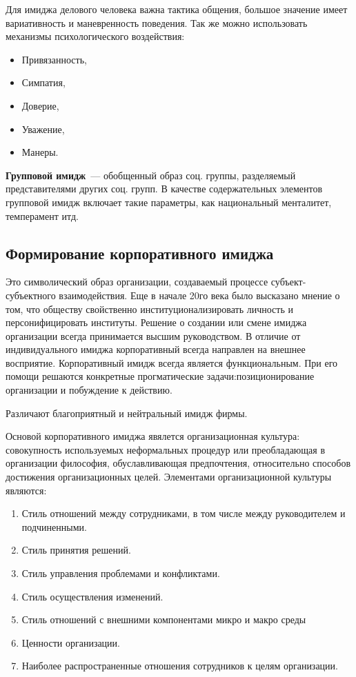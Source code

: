 Для имиджа делового человека важна тактика общения, большое значение имеет вариативность и маневренность поведения. Так же можно использовать механизмы психологического воздействия:
\begin{itemize}
	\item Привязанность,
	\item Симпатия,
	\item Доверие,
	\item Уважение,
	\item Манеры.
\end{itemize}

\textbf{Групповой имидж}~--- обобщенный образ соц. группы, разделяемый представителями других соц. групп. В качестве содержательных элементов групповой имидж включает такие параметры, как национальный менталитет, темперамент итд.

\subsection{Формирование корпоративного имиджа}
Это символический образ организации, создаваемый процессе субъект-субъектного взаимодействия. Еще в начале 20го века было высказано мнение о том, что обществу свойственно институционализировать личность и персонифицировать институты. Решение о создании или смене имиджа организации всегда принимается высшим руководством. В отличие от индивидуального имиджа корпоративный всегда направлен на внешнее восприятие. Корпоративный имидж всегда является функциональным. При его помощи решаются конкретные прогматические задачи:позиционирование организации и побуждение к действию.

Различают благоприятный и нейтральный имидж фирмы.

Основой корпоративного имиджа явялется организационная культура: совокупность используемых неформальных процедур или преобладающая в организации философия, обуславливающая предпочтения, относительно способов достижения организационных целей. Элементами организационной культуры являются:
\begin{enumerate}
	\item Стиль отношений между сотрудниками, в том числе между руководителем и подчиненными.
	\item Стиль принятия решений.
	\item Стиль управления проблемами и конфликтами.
	\item Стиль осуществления изменений.
	\item Стиль отношений с внешними компонентами микро и макро среды
	\item Ценности организации.
	\item Наиболее распространенные отношения сотрудников к целям организации.
\end{enumerate}

